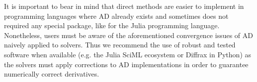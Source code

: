 It is important to bear in mind that direct methods are easier to implement in programming languages where AD already exists and sometimes does not required any special package, like for the Julia programming language.
Nonetheless, users must be aware of the aforementioned convergence issues of AD naively applied to solvers. 
Thus we recommend the use of robust and tested software when available (e.g. the Julia SciML ecosystem or Diffrax in Python) as the solvers must apply corrections to AD implementations in order to guarantee numerically correct derivatives.



